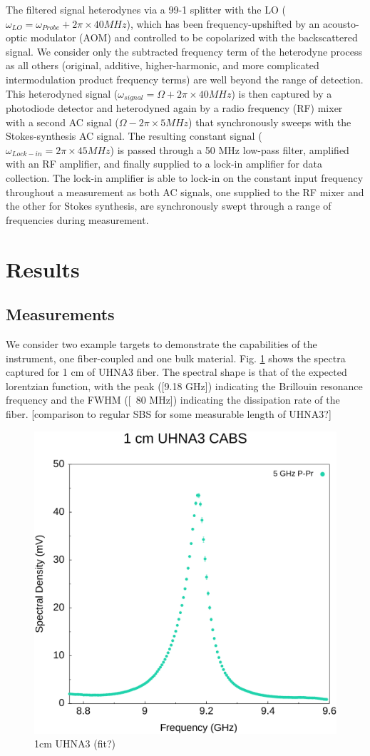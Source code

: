 \documentclass[%
  reprint,
  superscriptaddress,
  amsmath,amssymb,
  aps,
  prapplied,
]{revtex4-2}
\begin{document}
The filtered signal heterodynes via a 99-1 splitter with the LO ($\omega_{LO} = \omega_{Probe} + 2\pi\times40 MHz$), which has been frequency-upshifted by an acousto-optic modulator (AOM) and controlled to be copolarized with the backscattered signal. We consider only the subtracted frequency term of the heterodyne process as all others (original, additive, higher-harmonic, and more complicated intermodulation product frequency terms) are well beyond the range of detection. This heterodyned signal ($\omega_{signal} = \Omega + 2\pi\times40 MHz$) is then captured by a photodiode detector and heterodyned again by a radio frequency (RF) mixer with a second AC signal ($\Omega - 2\pi\times5 MHz$) that synchronously sweeps with the Stokes-synthesis AC signal. The resulting constant signal ($\omega_{Lock-in} = 2\pi\times45 MHz$) is passed through a 50 MHz low-pass filter, amplified with an RF amplifier, and finally supplied to a lock-in amplifier for data collection. The lock-in amplifier is able to lock-in on the constant input frequency throughout a measurement as both AC signals, one supplied to the RF mixer and the other for Stokes synthesis, are synchronously swept through a range of frequencies during measurement.


\section{Results}\label{Results}
\subsection*{Measurements}\label{Results:Measurements}

We consider two example targets to demonstrate the capabilities of the instrument, one fiber-coupled and one bulk material. Fig. \ref{fig:1cmUHNA3} shows the spectra captured for 1 cm of UHNA3 fiber. The spectral shape is that of the expected lorentzian function, with the peak ([9.18 GHz]) indicating the Brillouin resonance frequency and the FWHM ([~80 MHz]) indicating the dissipation rate of the fiber. [comparison to regular SBS for some measurable length of UHNA3?]

\begin{figure}[t]
  \centering
  \includegraphics[width=.45\textwidth]{1cmUHNA3.pdf}
  \caption{1cm UHNA3 (fit?)}\label{fig:1cmUHNA3}
\end{figure}
\end{document}
